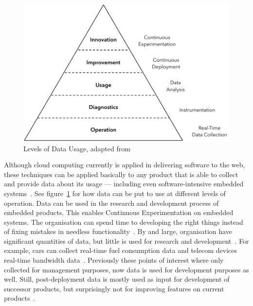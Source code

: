 \documentclass[english]{tktltiki2}
\begin{document}
\begin{figure}[h!]

    \centering

    \includegraphics[scale = 0.6]{figures/data-usage}

    \caption{Levels of Data Usage, adapted from~\cite{HB14}}
    \label{figure:data-usage}

    \vspace{1cm}

\end{figure}

Although cloud computing currently is applied in delivering software to the web, these techniques can be applied basically to any product that is able to collect and provide data about its usage — including even software-intensive embedded systems~\cite{BE12, Bos12}. See figure~\ref{figure:data-usage} for how data can be put to use at different levels of operation. Data can be used in the research and development process of embedded products. This enables Continuous Experimentation on embedded systems. The organisation can spend time to developing the right things instead of fixing mistakes in needless functionality~\cite{HAB12}. By and large, organisation have significant quantities of data, but little is used for research and development~\cite{HB14}. For example, cars can collect real-time fuel consumption data and telecom devices real-time bandwidth data~\cite{Bos12}. Previously these points of interest where only collected for management purposes, now data is used for development purposes as well. Still, post-deployment data is mostly used as input for development of successor products, but surprisingly not for improving features on current products~\cite{HB14}.
\end{document}
